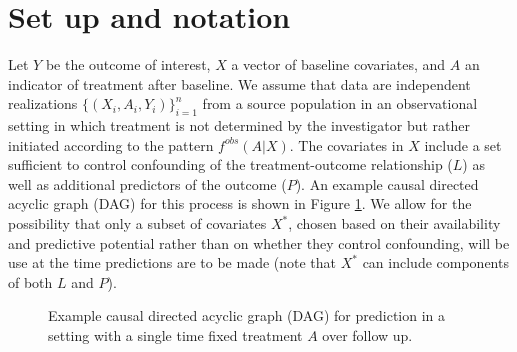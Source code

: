 \section{Set up and notation} \label{sec:setup}
Let $Y$ be the outcome of interest, $X$ a vector of baseline covariates, and $A$ an indicator of treatment after baseline. We assume that data are independent realizations $\{(X_i, A_i, Y_i)\}_{i=1}^n$ from a source population in an observational setting in which treatment is not determined by the investigator but rather initiated according to the pattern $f^{obs}(A | X)$. The covariates in $X$ include a set sufficient to control confounding of the treatment-outcome relationship ($L$) as well as additional predictors of the outcome ($P$). An example causal directed acyclic graph (DAG) for this process is shown in Figure \ref{fig:dag1}. We allow for the possibility that only a subset of covariates $X^*$, chosen based on their availability and predictive potential rather than on whether they control confounding, will be use at the time predictions are to be made (note that $X^*$ can include components of both $L$ and $P$).

\begin{figure}[t]
    \centering
    \caption{Example causal directed acyclic graph (DAG) for prediction in a setting with a single time fixed treatment $A$ over follow up.}
    \label{fig:dag1}
\end{figure}

